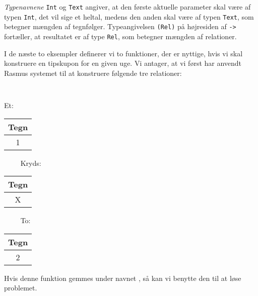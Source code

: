\documentclass{article}
\newcounter{eks}
\begin{document}
{\em Typenavnene\/} \verb"Int" og \verb"Text" angiver, at den f\o{}rste
aktuelle parameter skal v\ae{}re af typen \verb"Int", det vil sige et heltal,
medens den anden skal v\ae{}re af typen \verb"Text", som betegner
m\ae{}ngden af tegnf\o{}lger. Typeangivelsen \verb"(Rel)" p\aa{}
h\o{}jresiden af \verb"->" fort\ae{}ller, at resultatet er af type
\verb"Rel", som betegner m\ae{}ngden af relationer.

I de n\ae{}ste to eksempler definerer vi to funktioner, der er nyttige, hvis
vi skal konstruere en tipskupon for en given uge. Vi antager, at vi f\o{}rst
har anvendt {\sc Rasmus} systemet til at konstruere f\o{}lgende
tre relationer:
{\tt
\begin{center}
Et:~\begin{tabular}{|c|} \hline Tegn \\\hline 1 \\\hline\end{tabular}~~~~
Kryds:~\begin{tabular}{|c|} \hline Tegn \\\hline X \\\hline\end{tabular}~~~~
To:~\begin{tabular}{|c|} \hline Tegn \\\hline 2 \\\hline\end{tabular}
\end{center}
}


Hvis denne funktion gemmes under navnet , s\aa{} kan vi
benytte den til at l\o{}se problemet.
\end{document}
